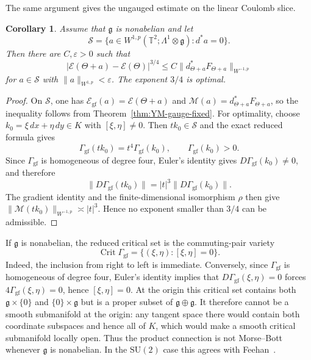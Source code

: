 \documentclass[11pt]{article}
\newtheorem{corollary}[theorem]{Corollary}
\theoremstyle{definition}
\theoremstyle{remark}
\begin{document}
The same argument gives the ungauged estimate on the linear Coulomb slice.

\begin{corollary}\label{cor:YM-coulomb}
Assume that $\mathfrak g$ is nonabelian and let
$$
\mathcal S=\{a\in W^{1,p}(\mathbb T^2;\Lambda^1\otimes\mathfrak g):d^*a=0\}.
$$
Then there are $C,\varepsilon>0$ such that
$$
|\mathcal E(\Theta+a)-\mathcal E(\Theta)|^{3/4}
\le C\|d_{\Theta+a}^*F_{\Theta+a}\|_{W^{-1,p}}
$$
for $a\in\mathcal S$ with $\|a\|_{W^{1,p}}<\varepsilon$. The exponent $3/4$ is optimal.
\end{corollary}

\begin{proof}
On $\mathcal S$, one has $\mathcal E_{\mathrm{gf}}(a)=\mathcal E(\Theta+a)$ and
$\mathcal M(a)=d_{\Theta+a}^*F_{\Theta+a}$, so the inequality follows from Theorem~\ref{thm:YM-gauge-fixed}. For optimality, choose $k_0=\xi\,dx+\eta\,dy\in K$ with $[\xi,\eta]\ne0$. Then $tk_0\in\mathcal S$ and the exact reduced formula gives
$$
\Gamma_{\mathrm{gf}}(tk_0)=t^4\Gamma_{\mathrm{gf}}(k_0),
\qquad \Gamma_{\mathrm{gf}}(k_0)>0.
$$
Since $\Gamma_{\mathrm{gf}}$ is homogeneous of degree four, Euler's identity gives $D\Gamma_{\mathrm{gf}}(k_0)\ne0$, and therefore
$$
\|D\Gamma_{\mathrm{gf}}(tk_0)\|=|t|^3\|D\Gamma_{\mathrm{gf}}(k_0)\|.
$$
The gradient identity and the finite-dimensional isomorphism $\rho$ then give $\|\mathcal M(tk_0)\|_{W^{-1,p}}\asymp |t|^3$. Hence no exponent smaller than $3/4$ can be admissible.
\end{proof}

If $\mathfrak g$ is nonabelian, the reduced critical set is the commuting-pair variety
$$
\operatorname{Crit}\Gamma_{\mathrm{gf}}
=\{(\xi,\eta):[\xi,\eta]=0\}.
$$
Indeed, the inclusion from right to left is immediate. Conversely, since $\Gamma_{\mathrm{gf}}$ is homogeneous of degree four, Euler's identity implies that $D\Gamma_{\mathrm{gf}}(\xi,\eta)=0$ forces $4\Gamma_{\mathrm{gf}}(\xi,\eta)=0$, hence $[\xi,\eta]=0$. At the origin this critical set contains both $\mathfrak g\times\{0\}$ and $\{0\}\times\mathfrak g$ but is a proper subset of $\mathfrak g\oplus\mathfrak g$. It therefore cannot be a smooth submanifold at the origin: any tangent space there would contain both coordinate subspaces and hence all of $K$, which would make a smooth critical submanifold locally open. Thus the product connection is not Morse--Bott whenever $\mathfrak g$ is nonabelian. In the $\mathrm{SU}(2)$ case this agrees with Feehan~\cite[Corollary~A.10]{FeehanFlat2019}.
\end{document}
